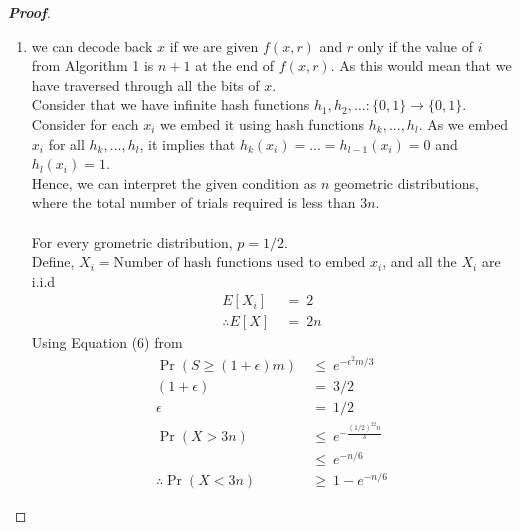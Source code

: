 \documentclass{article}
\begin{document}
\begin{proof}[\textbf{Proof}]
    \begin{enumerate}
        \item we can decode back $x$ if we are given $f(x,r)$ and $r$ only if 
        the value of $i$ from Algorithm 1 is $n+1$ at the end of $f(x,r)$. As
        this would mean that we have traversed through all the bits of $x$.\\
        Consider that we have infinite hash functions 
        $h_1,h_2,...:\{0,1\}\rightarrow\{0,1\}$.\\
        Consider for each $x_i$ we embed it using hash functions $h_k,...,h_l$.
        As we embed $x_i$ for all $h_k,...,h_l$, it implies that 
        $h_k(x_i)=...=h_{l-1}(x_i)=0$ and $h_l(x_i)=1$.\\
        Hence, we can interpret the given condition as $n$ geometric distributions,
        where the total number of trials required is less than $3n$.\\
        \\
        For every grometric distribution, $p=1/2$.\\
        Define, $X_i = \text{Number of hash functions used to embed }x_i$, and
        all the $X_i$ are i.i.d\\
        \begin{align}
            E[X_i] &~=~ 2 \nonumber \\
            \therefore E[X] &~=~ 2n \nonumber        
        \end{align}
        Using Equation (6) from \cite{HR90}
        \begin{align}
            \Pr(S\geq(1+\epsilon)m) &~\leq ~e^{-\epsilon^2m/3} \nonumber\\
            (1+\epsilon)&~=~3/2 \nonumber\\
            \epsilon&~=~1/2 \nonumber\\
            \Pr(X>3n)&~\leq ~e^{-\frac{(1/2)^22n}{3}} \nonumber\\
            &~\leq ~e^{-n/6} \nonumber \\
            \therefore \Pr(X<3n) &~\geq ~1-e^{-n/6} \nonumber
        \end{align}
        

\end{enumerate}
\end{proof}
\end{document}
